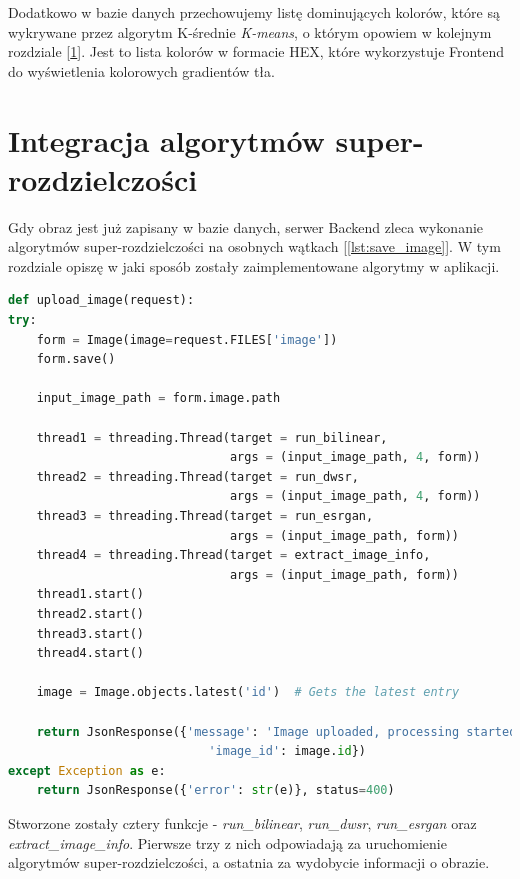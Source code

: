 Dodatkowo w bazie danych przechowujemy listę dominujących kolorów, które są wykrywane przez algorytm K-średnie \textit{K-means}, o którym opowiem w kolejnym rozdziale [\ref{sec:implementation-s-r}]. Jest to lista kolorów w formacie HEX, które wykorzystuje Frontend do wyświetlenia kolorowych gradientów tła.


\newpage
\section{Integracja algorytmów super-rozdzielczości} \label{sec:implementation-s-r}

Gdy obraz jest już zapisany w bazie danych, serwer Backend zleca wykonanie algorytmów super-rozdzielczości na osobnych wątkach [\ref{lst:save_image}]. W tym rozdziale opiszę w jaki sposób zostały zaimplementowane algorytmy w aplikacji.

\begin{lstlisting}[language=Python, caption=Obsługa zapisu i przetwarzania obrazów., label={lst:save_image}]
def upload_image(request):
try:
    form = Image(image=request.FILES['image'])
    form.save()

    input_image_path = form.image.path
    
    thread1 = threading.Thread(target = run_bilinear, 
                               args = (input_image_path, 4, form))
    thread2 = threading.Thread(target = run_dwsr, 
                               args = (input_image_path, 4, form))
    thread3 = threading.Thread(target = run_esrgan, 
                               args = (input_image_path, form))
    thread4 = threading.Thread(target = extract_image_info, 
                               args = (input_image_path, form))
    thread1.start()
    thread2.start()
    thread3.start()
    thread4.start()

    image = Image.objects.latest('id')  # Gets the latest entry

    return JsonResponse({'message': 'Image uploaded, processing started', 
                            'image_id': image.id})
except Exception as e:
    return JsonResponse({'error': str(e)}, status=400)
\end{lstlisting}

Stworzone zostały cztery funkcje - \textit{run\_bilinear}, \textit{run\_dwsr}, \textit{run\_esrgan} oraz\\ \textit{extract\_image\_info}. Pierwsze trzy z nich odpowiadają za uruchomienie algorytmów super-rozdzielczości, a ostatnia za wydobycie informacji o obrazie.





